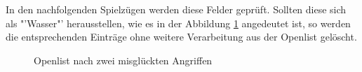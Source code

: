 In den nachfolgenden Spielzügen werden diese Felder geprüft.
Sollten diese sich als "'Wasser"' herausstellen, wie es in der Abbildung \ref{fig:Openlist2} angedeutet ist, so werden die entsprechenden Einträge ohne weitere Verarbeitung aus der Openlist gelöscht.
\begin{figure}[H]
  \centering
  \caption{Openlist nach zwei misglückten Angriffen}
  \label{fig:Openlist2}
\end{figure}


